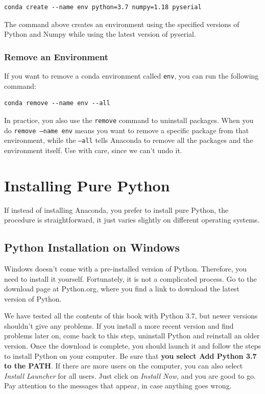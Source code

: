 \begin{verbatim}
conda create --name env python=3.7 numpy=1.18 pyserial
\end{verbatim}

The command above creates an environment using the specified versions of Python and Numpy while using the latest version of pyserial.

\subsubsection{Remove an Environment}
If you want to remove a conda environment called \texttt{env}, you can run the following command:

\begin{verbatim}
conda remove --name env --all
\end{verbatim}

In practice, you also use the \texttt{remove} command to uninstall packages. When you do \texttt{remove --name env} means you want to remove a specific package from that environment, while the \texttt{--all} tells Anaconda to remove all the packages and the environment itself. Use with care, since we can't undo it.

\section{Installing Pure Python}\label{sec:installing-pure-python}
If instead of installing Anaconda, you prefer to install pure Python, the procedure is straightforward, it just varies slightly on different operating systems.

\subsection{Python Installation on Windows}\label{subsec:python-installation-on-windows}
Windows doesn't come with a pre-installed version of Python. Therefore, you need to install it yourself. Fortunately, it is not a complicated process. Go to the download page at Python.org, where you find a link to download the latest version of Python.

We have tested all the contents of this book with Python 3.7, but newer versions shouldn't give any problems. If you install a more recent version and find problems later on, come back to this step, uninstall Python and reinstall an older version. Once the download is complete, you should launch it and follow the steps to install Python on your computer. Be sure that \textbf{you select Add Python 3.7 to the PATH}. If there are more users on the computer, you can also select \emph{Install Launcher} for all users. Just click on \textit{Install Now}, and you are good to go. Pay attention to the messages that appear, in case anything goes wrong.

